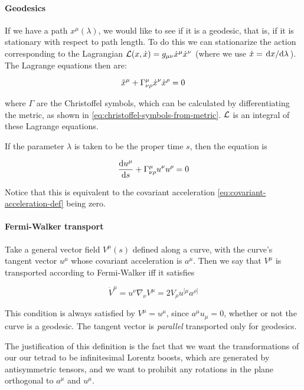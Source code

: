 \documentclass[main.tex]{subfiles}
\begin{document}
\paragraph{Geodesics}

If we have a path $x^\mu(\lambda)$, we would like to see if it is a geodesic, that is, if it is stationary with respect to path length. To do this we can stationarize the action corresponding to the Lagrangian $\mathcal{L} (x, \Dot{x}) = g_{\mu\nu} \Dot{x}^\mu \Dot{x}^\nu$ (where we use $\Dot{x} = \dv*{x}{\lambda}$). The Lagrange equations then are:

\begin{equation}
    \Ddot{x}^\mu + \Gamma^\mu_{\nu\rho} \Dot{x}^\nu \Dot{x}^\rho = 0
\end{equation}

where $\Gamma$ are the Christoffel symbols, which can be calculated by differentiating the metric, as shown in \eqref{eq:christoffel-symbols-from-metric}. $\mathcal{L}$ is an integral of these Lagrange equations.

If the parameter $\lambda$ is taken to be the proper time $s$, then the equation is

\begin{equation}
    \dv{u^\mu}{s} + \Gamma^\mu _{\nu\rho} u^\nu u^\rho = 0
\end{equation}

Notice that this is equivalent to the covariant acceleration \eqref{eq:covariant-acceleration-def} being zero.

\paragraph{Fermi-Walker transport}

Take a general vector field \(V ^{\mu} (s)\) defined along a curve, with the curve's tangent vector \(u^\mu\) whose covariant acceleration is \(a^\mu\).
Then we say that \(V^\mu\) is transported according to Fermi-Walker iff it satisfies

\begin{equation} \label{eq:fermi-walker-transport}
    \dot{V}^\mu  = u^\nu \nabla_\nu V^\mu
    = 2 V_\rho u^{[\mu} a^{\rho]}
\end{equation}

This condition is always satisfied by \(V^\mu = u^\mu\), since \(a^\mu u_\mu = 0\), whether or not the curve is a geodesic. The tangent vector is \emph{parallel} transported only for geodesics.

The justification of this definition is the fact that we want the transformations of our our tetrad to be infinitesimal Lorentz boosts, which are generated by antisymmetric tensors, and we want to prohibit any rotations in the plane orthogonal to \(a^\mu\) and \(u^\mu\).
\end{document}
